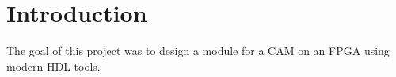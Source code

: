 \section{Introduction}
The goal of this project was to design a module for a CAM on an FPGA using modern HDL tools. 